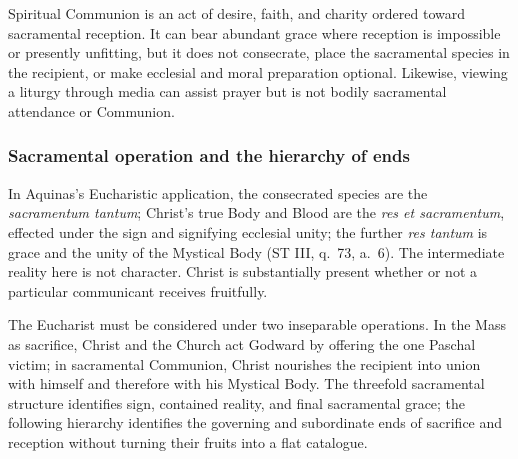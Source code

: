 Spiritual Communion is an act of desire, faith, and charity ordered toward sacramental reception. It can bear abundant grace where reception is impossible or presently unfitting, but it does not consecrate, place the sacramental species in the recipient, or make ecclesial and moral preparation optional. Likewise, viewing a liturgy through media can assist prayer but is not bodily sacramental attendance or Communion.

\subsubsection{Sacramental operation and the hierarchy of ends}

In Aquinas's Eucharistic application, the consecrated species are the \emph{sacramentum tantum}; Christ's true Body and Blood are the \emph{res et sacramentum}, effected under the sign and signifying ecclesial unity; the further \emph{res tantum} is grace and the unity of the Mystical Body (ST III, q.~73, a.~6). The intermediate reality here is not character. Christ is substantially present whether or not a particular communicant receives fruitfully.

The Eucharist must be considered under two inseparable operations. In the Mass as sacrifice, Christ and the Church act Godward by offering the one Paschal victim; in sacramental Communion, Christ nourishes the recipient into union with himself and therefore with his Mystical Body. The threefold sacramental structure identifies sign, contained reality, and final sacramental grace; the following hierarchy identifies the governing and subordinate ends of sacrifice and reception without turning their fruits into a flat catalogue.

